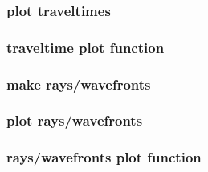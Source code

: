 \begin{frame} \frametitle{plot traveltimes}
\end{frame}
\cwpnote{}

\begin{frame} \frametitle{traveltime plot function}
\end{frame}
\cwpnote{}

\begin{frame}
\end{frame}
\cwpnote{}


\begin{frame} \frametitle{make rays/wavefronts}
\end{frame}
\cwpnote{}

\begin{frame} \frametitle{plot rays/wavefronts}
\end{frame}
\cwpnote{}

\begin{frame} \frametitle{rays/wavefronts plot function}
\end{frame}
\cwpnote{}

\begin{frame}
\end{frame}
\cwpnote{}

\begin{frame}

  
  \vfill


  \vfill
  
  \begin{center}
  \end{center}
  
\end{frame}
\cwpnote{}